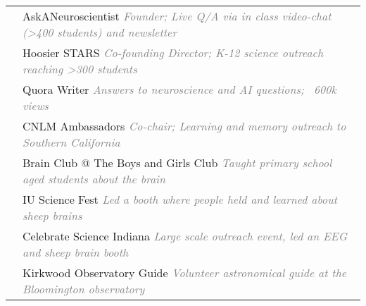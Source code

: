 \documentclass[11pt]{cooperCV_v1/cooperCV} %
\begin{document}
\begin{minipage}{\textwidth}







\begin{tabular}{ @{} p{} p{} @{} }
  
  \small \textcolor{gray}{{\emph{ }}} & AskANeuroscientist \small{\textcolor{gray}{{\emph{Founder; Live Q/A via in class video-chat (>400 students) and newsletter}}}} \\
  
  \small \textcolor{gray}{{\emph{ }}} & Hoosier STARS \small{\textcolor{gray}{{\emph{Co-founding Director; K-12 science outreach reaching >300 students}}}} \\
  
  \small \textcolor{gray}{{\emph{ }}} & Quora Writer \small{\textcolor{gray}{{\emph{Answers to neuroscience and AI questions; ~600k views}}}} \\
  
  \small \textcolor{gray}{{\emph{ }}} & CNLM Ambassadors \small{\textcolor{gray}{{\emph{Co-chair; Learning and memory outreach to Southern California}}}} \\
  
  \small \textcolor{gray}{{\emph{ }}} & Brain Club @ The Boys and Girls Club \small{\textcolor{gray}{{\emph{Taught primary school aged students about the brain}}}} \\
  
  \small \textcolor{gray}{{\emph{ }}} & IU Science Fest \small{\textcolor{gray}{{\emph{Led a booth where people held and learned about sheep brains}}}} \\
  
  \small \textcolor{gray}{{\emph{ }}} & Celebrate Science Indiana \small{\textcolor{gray}{{\emph{Large scale outreach event, led an EEG and sheep brain booth}}}} \\
  
  \small \textcolor{gray}{{\emph{ }}} & Kirkwood Observatory Guide \small{\textcolor{gray}{{\emph{Volunteer astronomical guide at the Bloomington observatory}}}} \\
  
\end{tabular}



\end{minipage}
\end{document}
